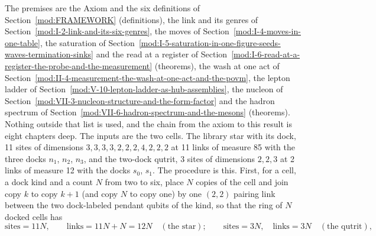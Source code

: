 \begin{chproof}
The premises are the Axiom and the six definitions of Section~\ref{mod:FRAMEWORK} (definitions), the link and its genres of Section~\ref{mod:I-2-link-and-its-six-genres}, the moves of Section~\ref{mod:I-4-moves-in-one-table}, the saturation of Section~\ref{mod:I-5-saturation-in-one-figure-seeds-waves-termination-sinks} and the read at a register of Section~\ref{mod:I-6-read-at-a-register-the-probe-and-the-measurement} (theorems), the wash at one act of Section~\ref{mod:II-4-measurement-the-wash-at-one-act-and-the-povm}, the lepton ladder of Section~\ref{mod:V-10-lepton-ladder-as-hub-assemblies}, the nucleon of Section~\ref{mod:VII-3-nucleon-structure-and-the-form-factor} and the hadron spectrum of Section~\ref{mod:VII-6-hadron-spectrum-and-the-mesons} (theorems). Nothing outside that list is used, and the chain from the axiom to this result is eight chapters deep.
The inputs are the two cells. The library star with its dock, 11 sites of dimensions $3,3,3,3,2,2,2,4,2,2,2$ at 11 links of measure 85 with the three docks $n_1$, $n_2$, $n_3$, and the two-dock qutrit, 3 sites of dimensions $2,2,3$ at 2 links of measure 12 with the docks $s_0$, $s_1$. The procedure is this. First, for a cell, a dock kind and a count $N$ from two to six, place $N$ copies of the cell and join copy $k$ to copy $k+1$ (and copy $N$ to copy one) by one $(2,2)$ pairing link between the two dock-labeled pendant qubits of the kind, so that the ring of $N$ docked cells has
\begin{equation}
\text{sites} = 11N, \qquad \text{links} = 11N + N = 12N \quad (\text{the star}); \qquad \text{sites} = 3N, \quad \text{links} = 3N \quad (\text{the qutrit}),
\end{equation}

\end{chproof}
